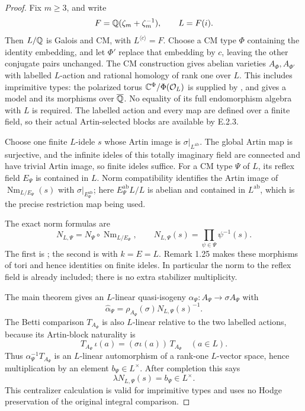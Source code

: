\begin{proof}
Fix \(m\ge3\), and write
\[
 F=\mathbb Q(\zeta_m+\zeta_m^{-1}),\qquad L=F(i).
\]
Then \(L/\mathbb Q\) is Galois and CM, with \(L^{\langle c\rangle}=F\).
Choose a CM type \(\Phi\) containing the identity embedding,
and let \(\Phi'\) replace that embedding by \(c\), leaving
the other conjugate pairs unchanged. The CM construction
gives abelian varieties \(A_\Phi,A_{\Phi'}\) with labelled
\(L\)-action and rational homology of rank one over \(L\).
This includes imprimitive types: the polarized torus
\(\mathbb C^\Phi/\Phi(\mathcal O_L)\) is supplied by
\cite[Example 2.11]{GenMilneCM2020}, and
\cite[Proposition 7.9 and Corollary 7.10,
pp.~54--55]{GenMilneCM2020} gives a model and its morphisms
over \(\overline{\mathbb Q}\). No equality of its full endomorphism algebra
with \(L\) is required. The labelled action and every
map are defined over a finite field, so their actual
Artin-selected blocks are available by E.2.3.

Choose one finite \(L\)-idele \(s\) whose Artin image is
\(\sigma|_{L^{\mathrm{ab}}}\). The global Artin map is
surjective, and the infinite ideles of this totally
imaginary field are connected and have trivial Artin
image, so finite ideles suffice.
For a CM type \(\Psi\) of \(L\), its reflex field
\(E_\Psi\) is contained in \(L\). Norm compatibility
identifies the Artin image of
\(\operatorname{Nm}_{L/E_\Psi}(s)\) with
\(\sigma|_{E_\Psi^{\mathrm{ab}}}\); here
\(E_\Psi^{\mathrm{ab}}L/L\) is abelian and contained
in \(L^{\mathrm{ab}}\), which is the precise
restriction map being used.

The exact norm formulas are
\[
 N_{L,\Psi}
  =N_\Psi\circ\operatorname{Nm}_{L/E_\Psi},
 \qquad
 N_{L,\Psi}(s)=\prod_{\psi\in\Psi}\psi^{-1}(s).
 \tag{E.2.20c}
\]
The first is \cite[Proposition 1.23, p.~16]{GenMilneCM2020};
the second is \cite[Proposition 1.26, p.~17]{GenMilneCM2020}
with \(k=E=L\). Remark 1.25 makes these morphisms of
tori and hence identities on finite ideles.
In particular the norm to the reflex field is already
included; there is no extra stabilizer multiplicity.

The main theorem gives an \(L\)-linear quasi-isogeny
\(\alpha_\Psi:A_\Psi\to\sigma A_\Psi\) with
\[
 \widehat\alpha_\Psi
     =\rho_{A_\Psi}(\sigma)N_{L,\Psi}(s)^{-1}.
\]
The Betti comparison \(T_{A_\Psi}\) is also \(L\)-linear
relative to the two labelled actions, because its
Artin-block naturality is
\[
 T_{A_\Psi}\,\iota(a)=(\sigma\iota(a))\,T_{A_\Psi}
 \quad(a\in L).
\]
Thus \(\alpha_\Psi^{-1}T_{A_\Psi}\) is an \(L\)-linear
automorphism of a rank-one \(L\)-vector space, hence
multiplication by an element \(b_\Psi\in L^\times\).
After completion this says
\[
 \lambda N_{L,\Psi}(s)=b_\Psi\in L^\times.
 \tag{E.2.20d}
\]
This centralizer calculation is valid for imprimitive
types and uses no Hodge preservation of the original
integral comparison.


\end{proof}
